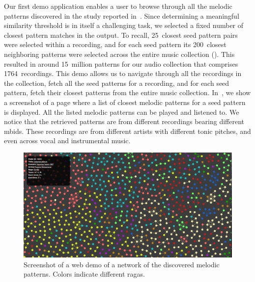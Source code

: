 Our first demo application enables a user to browse through all the melodic patterns discovered in the study reported in~\secref{}. Since determining a meaningful similarity threshold is in itself a challenging task, we selected a fixed number of closest pattern matches in the output. To recall, 25~closest seed pattern pairs were selected within a recording, and for each seed pattern its 200~closest neighboring patterns were selected  across the entire music collection (\secref{}). This resulted in around 15~million patterns for our audio collection that comprises 1764~recordings. This demo allows us to navigate through all the recordings in the collection, fetch all the seed patterns for a recording, and for each seed pattern, fetch their closest patterns from the entire music collection. In~, we show a screenshot of a page where a list of closest melodic patterns for a seed pattern is displayed. All the listed melodic patterns can be played and listened to. We notice that the retrieved patterns are from different recordings bearing different \glspl{mbid}. These recordings are from different artists with different tonic pitches, and even across vocal and instrumental music. 

\begin{figure}
	\begin{center}
		\includegraphics[width=\figSizeHundred]{ch08_applications/figures/patternNetwork1.png}
	\end{center}
	\caption[A web demo of a network of the discovered melodic patterns]{Screenshot of a web demo of a network of the discovered melodic patterns. Colors indicate different \glspl{raga}.}
	\label{fig:network_patterns}
\end{figure}

